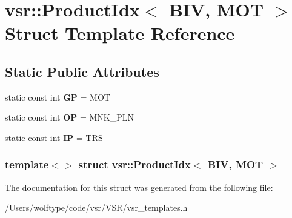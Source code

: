 \hypertarget{structvsr_1_1_product_idx_3_01_b_i_v_00_01_m_o_t_01_4}{\section{vsr\-:\-:Product\-Idx$<$ B\-I\-V, M\-O\-T $>$ Struct Template Reference}
\label{structvsr_1_1_product_idx_3_01_b_i_v_00_01_m_o_t_01_4}
}
\subsection*{Static Public Attributes}
\begin{DoxyCompactItemize}
\item 
\hypertarget{structvsr_1_1_product_idx_3_01_b_i_v_00_01_m_o_t_01_4_a854b98cef19af7faefbdf6b5cbe350dd}{static const int {\bfseries G\-P} = M\-O\-T}\label{structvsr_1_1_product_idx_3_01_b_i_v_00_01_m_o_t_01_4_a854b98cef19af7faefbdf6b5cbe350dd}

\item 
\hypertarget{structvsr_1_1_product_idx_3_01_b_i_v_00_01_m_o_t_01_4_a0d1c42dd400cca96f96ead5e4ce21b67}{static const int {\bfseries O\-P} = M\-N\-K\-\_\-\-P\-L\-N}\label{structvsr_1_1_product_idx_3_01_b_i_v_00_01_m_o_t_01_4_a0d1c42dd400cca96f96ead5e4ce21b67}

\item 
\hypertarget{structvsr_1_1_product_idx_3_01_b_i_v_00_01_m_o_t_01_4_a15c3404e5518faf554d5461ba6b21107}{static const int {\bfseries I\-P} = T\-R\-S}\label{structvsr_1_1_product_idx_3_01_b_i_v_00_01_m_o_t_01_4_a15c3404e5518faf554d5461ba6b21107}

\end{DoxyCompactItemize}
\subsubsection*{template$<$$>$ struct vsr\-::\-Product\-Idx$<$ B\-I\-V, M\-O\-T $>$}



The documentation for this struct was generated from the following file\-:\begin{DoxyCompactItemize}
\item 
/\-Users/wolftype/code/vsr/\-V\-S\-R/vsr\-\_\-templates.\-h\end{DoxyCompactItemize}

